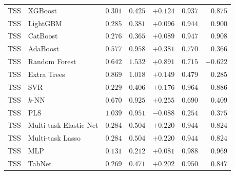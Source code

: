 \begin{longtable}{lp{3.1cm}rrrrr}
TSS & XGBoost & $0.301$ & $0.425$ & $+0.124$ & $0.937$ & $0.875$ \\
TSS & LightGBM & $0.285$ & $0.381$ & $+0.096$ & $0.944$ & $0.900$ \\
TSS & CatBoost & $0.276$ & $0.365$ & $+0.089$ & $0.947$ & $0.908$ \\
TSS & AdaBoost & $0.577$ & $0.958$ & $+0.381$ & $0.770$ & $0.366$ \\
TSS & Random Forest & $0.642$ & $1.532$ & $+0.891$ & $0.715$ & $-0.622$ \\
TSS & Extra Trees & $0.869$ & $1.018$ & $+0.149$ & $0.479$ & $0.285$ \\
TSS & SVR & $0.229$ & $0.406$ & $+0.176$ & $0.964$ & $0.886$ \\
TSS & $k$-NN & $0.670$ & $0.925$ & $+0.255$ & $0.690$ & $0.409$ \\
TSS & PLS & $1.039$ & $0.951$ & $-0.088$ & $0.254$ & $0.375$ \\
TSS & Multi-task Elastic Net & $0.284$ & $0.504$ & $+0.220$ & $0.944$ & $0.824$ \\
TSS & Multi-task Lasso & $0.284$ & $0.504$ & $+0.220$ & $0.944$ & $0.824$ \\
TSS & MLP & $0.131$ & $0.212$ & $+0.081$ & $0.988$ & $0.969$ \\
TSS & TabNet & $0.269$ & $0.471$ & $+0.202$ & $0.950$ & $0.847$ \\
\end{longtable}
